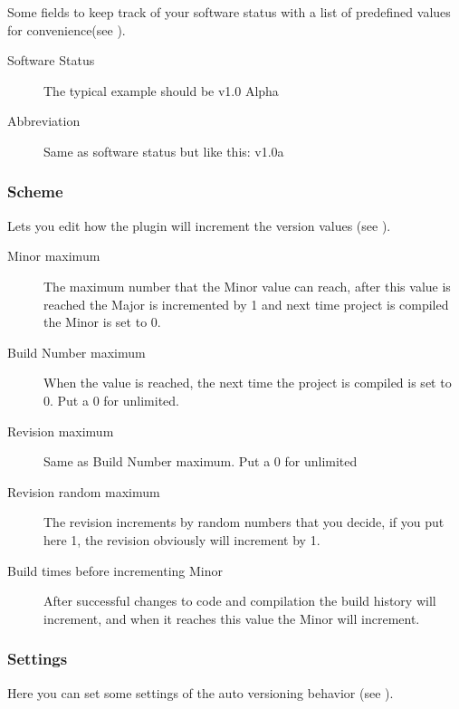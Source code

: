 Some fields to keep track of your software status with a list of predefined values for convenience(see ).

\begin{description}
\item[Software Status] The typical example should be v1.0 Alpha
\item[Abbreviation] Same as software status but like this: v1.0a
\end{description}


\subsubsection{Scheme}

Lets you edit how the plugin will increment the version values (see ).


\begin{description}
\item[Minor maximum] The maximum number that the Minor value can reach, after this value is reached the Major is incremented by 1 and next time project is compiled the Minor is set to 0.
\item[Build Number maximum] When the value is reached, the next time the project is compiled is set to 0. Put a 0 for unlimited.
\item[Revision maximum] Same as Build Number maximum. Put a 0 for unlimited
\item[Revision random maximum] The revision increments by random numbers that you decide, if you put here 1, the revision obviously will increment by 1.
\item[Build times before incrementing Minor] After successful changes to code and compilation the build history will increment, and when it reaches this value the Minor will increment.
\end{description}

\subsubsection{Settings}

Here you can set some settings of the auto versioning behavior (see ).


